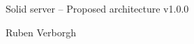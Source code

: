 \documentclass[10pt]{article}
\begin{document}
{
\Large
Solid server -- Proposed architecture v1.0.0

\large
Ruben Verborgh

\vspace{2em}
}

\end{document}
